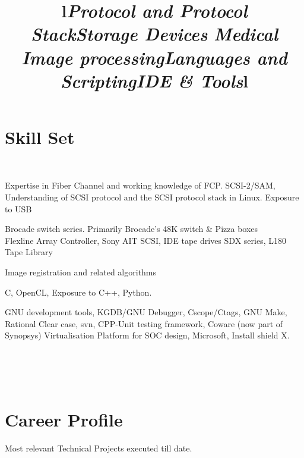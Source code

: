\begin{resume}
\section{\sc Skill Set}

\begin{format}
\title{l}\\
\end{format}

\title {\em Protocol and Protocol Stack}
\begin {position}
Expertise in Fiber Channel and working knowledge of FCP. SCSI-2/SAM, Understanding of SCSI protocol and the SCSI protocol stack in Linux.  Exposure to USB
\end{position}

\title {\em Storage Devices }
\begin {position}
 Brocade switch series. Primarily Brocade's 48K switch \& Pizza boxes \\
 Flexline Array Controller, Sony AIT SCSI, IDE tape drives SDX series, L180 Tape Library
\end{position}

\title {\em Medical Image processing}
\begin{position}
Image registration and related algorithms
\end{position}

\title {\em Languages and Scripting}
\begin{position}
C, OpenCL, Exposure to C++, Python. 
\end{position}

\title {\em IDE \& Tools} 
\begin {position}
GNU development tools, KGDB/GNU Debugger, Cscope/Ctags, GNU Make, Rational Clear case, svn, CPP-Unit testing framework, Coware (now part of Synopsys) Virtualisation Platform for SOC design, Microsoft, Install shield X.
\end{position}

\begin{format}
\title{l}\\
\\
\body\\
\end{format}

\section{\sc Career Profile}
Most relevant Technical Projects executed till date.


\end{resume}

